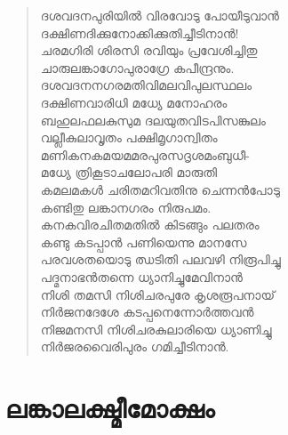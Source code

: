 \begin{verse}
ദശവദനപുരിയില്‍ വിരവോടു പോയീടുവാന്‍\\
ദക്ഷിണദിക്കുനോക്കിക്കുതിച്ചീടിനാന്‍!\\
ചരമഗിരി ശിരസി രവിയും പ്രവേശിച്ചിതു\\
ചാരുലങ്കാഗോപുരാഗ്രേ കപീന്ദ്രനും.\\
ദശവദനനഗരമതിവിമലവിപുലസ്ഥലം\\
ദക്ഷിണവാരിധി മധ്യേ മനോഹരം\\
ബഹുലഫലകുസുമ ദലയുതവിടപിസങ്കുലം\\
വല്ലീകുലാവൃതം പക്ഷിമൃഗാന്വിതം\\
മണികനകമയമമരപുരസദൃശമംബുധീ-\\
മധ്യേ ത്രികൂടാചലോപരി മാരുതി\\
കമലമകള്‍ ചരിതമറിവതിനു ചെന്നന്‍പോടു\\
കണ്ടിതു ലങ്കാനഗരം നിരുപമം.\\
കനകവിരചിതമതില്‍ കിടങ്ങും പലതരം\\
കണ്ടു കടപ്പാന്‍ പണിയെന്നു മാനസേ\\
പരവശതയൊടു ഝടിതി പലവഴി നിരൂപിച്ചു\\
പദ്മനാഭന്‍തന്നെ ധ്യാനിച്ചുമേവിനാന്‍\\
നിശി തമസി നിശിചരപുരേ കൃശരൂപനായ്\\
നിര്‍ജനദേശേ കടപ്പനെന്നോര്‍ത്തവന്‍\\
നിജമനസി നിശിചരകുലാരിയെ ധ്യാണിച്ചു\\
നിര്‍ജരവൈരിപുരം ഗമിച്ചീടിനാന്‍.
\end{verse}


\section{ലങ്കാലക്ഷ്മീമോക്ഷം}

